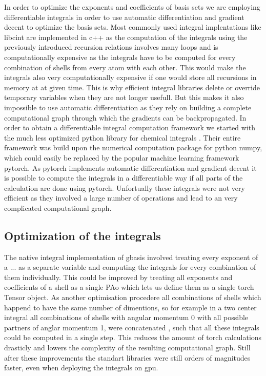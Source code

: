In order to optimize the exponents and coefficients of basis sets we are employing differentiable integrals in order to use automatic differentiation and gradient decent to optimize the basis sets. Most commonly used integral implentations like libcint\cite{sun_libcint_2015} are implemented in c++ as the computation of the integrals using the previously introduced recursion relations involves many loops and is computationally expensive as the integrals have to be computed for every combination of shells from every atom with each other. This would make the integrals also very computationally expensive if one would store all recursions in memory at at given time. This is why efficient integral libraries delete or override temporary variables when they are not longer usefull. But this makes it also impossible to use automatic differentiation as they rely on building a complete computational graph through which the gradients can be backpropagated. In order to obtain a differentiable integral computation framework we started with the much less optimized python library for chemical integrals \cite{kim_gbasis_2024}. Their entire framework was build upon the numerical computation package for python numpy\cite{harris2020array}, which could easily be replaced by the popular machine learning framework pytorch\cite{paszke2019pytorch}. As pytorch implements automatic differentiation and gradient decent it is possible to compute the integrals in a differentiable way if all parts of the calculation are done using pytorch. Unfortually these integrals were not very efficient as they involved a large number of operations and lead to an very complicated computational graph.

\subsection{Optimization of the integrals}
The native integral implementation of gbasis involved treating every exponent of a ... as a separate variable and computing the integrals for every combination of them individually. This could be improved by treating all exponents and coefficients of a shell as a single PAo which lets us define them as a single torch Tensor object. As another optimisation procedere all combinations of shells which happend to have the same number of dimentions, so for example in a two center integral all combinations of shells with angular momentum 0 with all possible partners of anglar momentum 1, were concatenated , such that all these integrals could be computed in a single step. This reduces the amount of torch calculations drasticly and lowers the complexity of the resulting computational graph.
Still after these improvements the standart libraries were still orders of magnitudes faster, even when deploying the integrals on gpu.